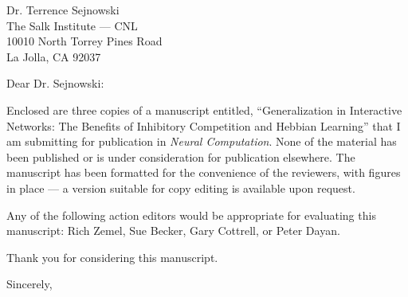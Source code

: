 \documentclass [11pt]{letter}
\begin{document}
\begin{letter}
{Dr. Terrence Sejnowski\\
The Salk Institute --- CNL\\
10010 North Torrey Pines Road\\
La Jolla, CA 92037\\}

\opening{Dear Dr. Sejnowski:}

Enclosed are three copies of a manuscript entitled, ``Generalization
in Interactive Networks: The Benefits of Inhibitory Competition and
Hebbian Learning'' that I am submitting for publication in {\em Neural
  Computation}.  None of the material has been published or is under
consideration for publication elsewhere.  The manuscript has been
formatted for the convenience of the reviewers, with figures in place
--- a version suitable for copy editing is available upon request.

Any of the following action editors would be appropriate for
evaluating this manuscript: Rich Zemel, Sue Becker, Gary Cottrell, or
Peter Dayan.

Thank you for considering this manuscript.

\closing{Sincerely,}

\end{letter}
\end{document}
